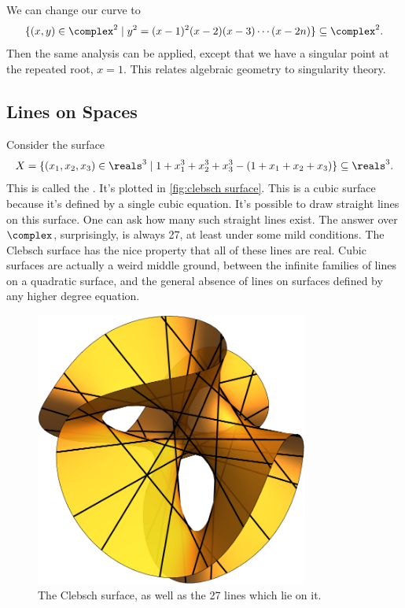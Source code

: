 \documentclass[fleqn]{NotesClass}
\begin{document}
    We can change our curve to
    \begin{equation}
        \{(x, y) \in \complex^2 \mid y^2 = (x - 1)^2(x - 2)(x - 3) \dotsm (x - 2n)\} \subseteq \complex^2.
    \end{equation}
    Then the same analysis can be applied, except that we have a singular point at the repeated root, \(x = 1\).
    This relates algebraic geometry to singularity theory.
    
    \subsection{Lines on Spaces}
    Consider the surface
    \begin{equation}
        X = \{(x_1, x_2, x_3) \in \reals^3 \mid 1 + x_1^3 + x_2^3 + x_3^3 - (1 + x_1 + x_2 + x_3)\} \subseteq \reals^3.
    \end{equation}
    This is called the .
    It's plotted in \cref{fig:clebsch surface}.
    This is a cubic surface because it's defined by a single cubic equation.
    It's possible to draw straight lines on this surface.
    One can ask how many such straight lines exist.
    The answer over \(\complex\), surprisingly, is always 27, at least under some mild conditions.
    The Clebsch surface has the nice property that all of these lines are real.
    Cubic surfaces are actually a weird middle ground, between the infinite families of lines on a quadratic surface, and the general absence of lines on surfaces defined by any higher degree equation.
    
    \begin{figure}
        \centering
        \includegraphics[width=0.8\textwidth]{images/clebsch-surface}
        \caption{The Clebsch surface, as well as the 27 lines which lie on it.}
    \end{figure}
    
\end{document}
